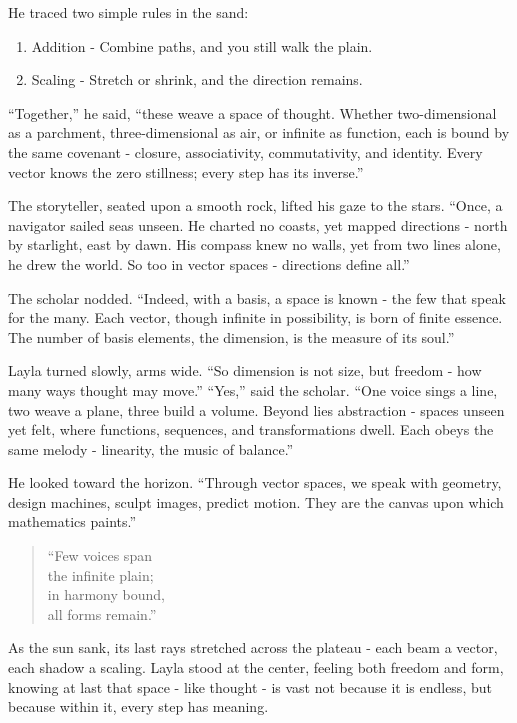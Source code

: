 \documentclass[
  letterpaper,
  DIV=11,
  numbers=noendperiod]{scrreprt}
\providecommand{\tightlist}{%
  \setlength{\itemsep}{0pt}\setlength{\parskip}{0pt}}
\begin{document}
He traced two simple rules in the sand:

\begin{enumerate}
\def\labelenumi{\arabic{enumi}.}
\tightlist
\item
  Addition - Combine paths, and you still walk the plain.
\item
  Scaling - Stretch or shrink, and the direction remains.
\end{enumerate}

``Together,'' he said, ``these weave a space of thought. Whether
two-dimensional as a parchment, three-dimensional as air, or infinite as
function, each is bound by the same covenant - closure, associativity,
commutativity, and identity. Every vector knows the zero stillness;
every step has its inverse.''

The storyteller, seated upon a smooth rock, lifted his gaze to the
stars. ``Once, a navigator sailed seas unseen. He charted no coasts, yet
mapped directions - north by starlight, east by dawn. His compass knew
no walls, yet from two lines alone, he drew the world. So too in vector
spaces - directions define all.''

The scholar nodded. ``Indeed, with a basis, a space is known - the few
that speak for the many. Each vector, though infinite in possibility, is
born of finite essence. The number of basis elements, the dimension, is
the measure of its soul.''

Layla turned slowly, arms wide. ``So dimension is not size, but freedom
- how many ways thought may move.'' ``Yes,'' said the scholar. ``One
voice sings a line, two weave a plane, three build a volume. Beyond lies
abstraction - spaces unseen yet felt, where functions, sequences, and
transformations dwell. Each obeys the same melody - linearity, the music
of balance.''

He looked toward the horizon. ``Through vector spaces, we speak with
geometry, design machines, sculpt images, predict motion. They are the
canvas upon which mathematics paints.''

\begin{quote}
``Few voices span\\
the infinite plain;\\
in harmony bound,\\
all forms remain.''
\end{quote}

As the sun sank, its last rays stretched across the plateau - each beam
a vector, each shadow a scaling. Layla stood at the center, feeling both
freedom and form, knowing at last that space - like thought - is vast
not because it is endless, but because within it, every step has
meaning.
\end{document}
